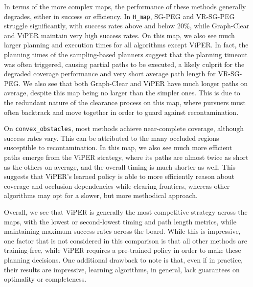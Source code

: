 \documentclass[conference]{IEEEtran}
\begin{document}
In terms of the more complex maps, the performance of these methods generally degrades, either in success or efficiency. In \texttt{H\_map}, SG-PEG and VR-SG-PEG struggle significantly, with success rates above and below 20\%, while Graph-Clear and ViPER maintain very high success rates. On this map, we also see much larger planning and execution times for all algorithms except ViPER. In fact, the planning times of the sampling-based planners suggest that the planning timeout was often triggered, causing partial paths to be executed, a likely culprit for the degraded coverage performance and very short average path length for VR-SG-PEG. 
We also see that both Graph-Clear and ViPER have much longer paths on average, despite this map being no larger than the simpler ones. This is due to the redundant nature of the clearance process on this map, where pursuers must often backtrack and move together in order to guard against recontamination.

On \texttt{convex\_obstacles}, most methods achieve near-complete coverage, although success rates vary. This can be attributed to the many occluded regions susceptible to recontamination. In this map, we also see much more efficient paths emerge from the ViPER strategy, where its paths are almost twice as short as the others on average, and the overall timing is much shorter as well. This suggests that ViPER's learned policy is able to more efficiently reason about coverage and occlusion dependencies while clearing frontiers, whereas other algorithms may opt for a slower, but more methodical approach.

Overall, we see that ViPER is generally the most competitive strategy across the maps, with the lowest or second-lowest timing and path length metrics, while maintaining maximum success rates across the board. While this is impressive, one factor that is not considered in this comparison is that all other methods are training-free, while ViPER requires a pre-trained policy in order to make these planning decisions.
One additional drawback to note is that, even if in practice, their results are impressive, learning algorithms, in general, lack guarantees on optimality or completeness.
\end{document}
